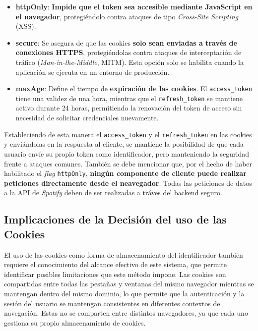 \setlength{\itemsep}{0pt}
\begin{itemize}
    \item \textbf{httpOnly}: \textbf{Impide que el token sea accesible mediante JavaScript en el navegador}, protegiéndolo contra ataques de tipo \textit{Cross-Site Scripting} (XSS).
    \item \textbf{secure}: Se asegura de que las cookies \textbf{solo sean enviadas a través de conexiones HTTPS}, protegiéndolas contra ataques de interceptación de tráfico (\textit{Man-in-the-Middle}, MITM). Esta opción solo se habilita cuando la aplicación se ejecuta en un entorno de producción.
    \item \textbf{maxAge}: Define el tiempo de \textbf{expiración de las cookies}. El \texttt{access\_token} tiene una validez de una hora, mientras que el \texttt{refresh\_token} se mantiene activo durante 24 horas, permitiendo la renovación del token de acceso sin necesidad de solicitar credenciales nuevamente.
\end{itemize}

Estableciendo de esta manera el \texttt{access\_token} y el \texttt{refresh\_token} en las cookies y enviándolas en la respuesta al cliente, se mantiene la posibilidad de que cada usuario envíe su propio token como identificador, pero manteniendo la seguridad frente a ataques comunes. También se debe mencionar que, por el hecho de haber habilitado el \textit{flag} \texttt{httpOnly}, \textbf{ningún componente de cliente puede realizar peticiones directamente desde el neavegador}. Todas las peticiones de datos a la API de \textit{Spotify} deben de ser realizadas a tráves del backend seguro.

\subsection*{Implicaciones de la Decisión del uso de las Cookies}

El uso de las cookies como forma de almacenamiento del identificador también requiere el conocimiento del alcance efectivo de este sistema, que permite identificar posibles limitaciones que este método impone. Las cookies son compartidas entre todas las pestañas y ventanas del mismo navegador mientras se mantengan dentro del mismo dominio, lo que permite que la autenticación y la sesión del usuario se mantengan consistentes en diferentes contextos de navegación. Estas no se comparten entre distintos navegadores, ya que cada uno gestiona su propio almacenamiento de cookies.

